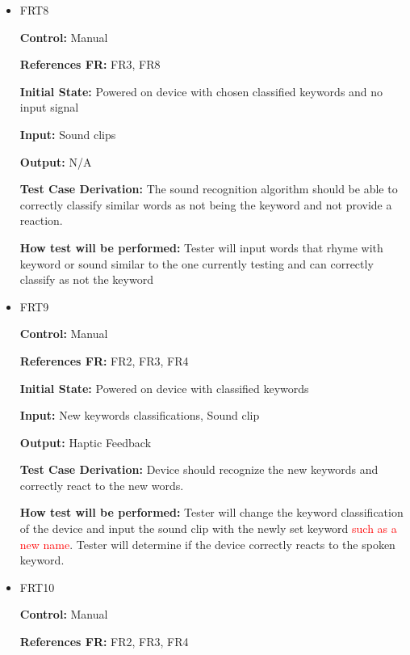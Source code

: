 \documentclass[12pt, titlepage]{article}
\begin{document}
\begin{itemize}

\item{FRT8}

\textbf{Control:} Manual

\textbf{References FR:} FR3, FR8 					

\textbf{Initial State:} Powered on device with chosen classified keywords and no input signal  
					
\textbf{Input:} Sound clips
					
\textbf{Output:} N/A

\textbf{Test Case Derivation:} The sound recognition algorithm should be able to correctly classify similar words as not being the keyword and not provide a reaction.
					
\textbf{How test will be performed:} Tester will input words that rhyme with keyword or sound similar to the one currently testing and can correctly classify as not the keyword


\item{FRT9}

\textbf{Control:} Manual

\textbf{References FR:} FR2, FR3, FR4 					

\textbf{Initial State:} Powered on device with classified keywords 
					
\textbf{Input:} New keywords classifications, Sound clip
					
\textbf{Output:} Haptic Feedback

\textbf{Test Case Derivation:} Device should recognize the new keywords and correctly react to the new words.
					
\textbf{How test will be performed:} Tester will change the keyword classification of the device and input the sound clip with the newly set keyword \textcolor{red}{such as a new name}. Tester will determine if the device correctly reacts to the spoken keyword.


\item{FRT10}

\textbf{Control:} Manual

\textbf{References FR:} FR2, FR3, FR4 					


\end{itemize}
\end{document}
